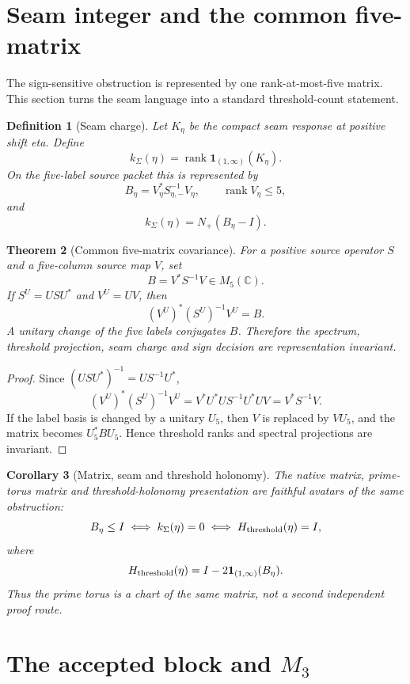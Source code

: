 \documentclass[11pt]{article}
\newtheorem{theorem}{Theorem}[section]
\newtheorem{corollary}[theorem]{Corollary}
\newtheorem{definition}[theorem]{Definition}
\newcommand{\C}{\mathbb C}
\newcommand{\BSEta}{B_\eta}
\newcommand{\kSigma}{k_\Sigma}
\newcommand{\rank}{\operatorname{rank}}
\begin{document}
\section{Seam integer and the common five-matrix}

The sign-sensitive obstruction is represented by one rank-at-most-five matrix.  This section turns the seam language into a standard threshold-count statement.

\begin{definition}[Seam charge]
Let \(K_\eta\) be the compact seam response at positive shift eta.  Define
\[
\kSigma(\eta)=\rank\mathbf 1_{(1,\infty)}(K_\eta).
\]
On the five-label source packet this is represented by
\[
\BSEta=V_\eta^*S_{\eta,-}^{-1}V_\eta,
\qquad
\rank V_\eta\le5,
\]
and
\[
\kSigma(\eta)=N_+(\BSEta-I).
\]
\end{definition}

\begin{theorem}[Common five-matrix covariance]
For a positive source operator \(S\) and a five-column source map \(V\), set
\[
B=V^*S^{-1}V\in M_5(\C).
\]
If \(S^U=USU^*\) and \(V^U=UV\), then
\[
(V^U)^*(S^U)^{-1}V^U=B.
\]
A unitary change of the five labels conjugates \(B\).  Therefore the spectrum, threshold projection, seam charge and sign decision are representation invariant.
\end{theorem}

\begin{proof}
Since \((USU^*)^{-1}=US^{-1}U^*\),
\[
(V^U)^*(S^U)^{-1}V^U
=V^*U^*US^{-1}U^*UV
=V^*S^{-1}V.
\]
If the label basis is changed by a unitary \(U_5\), then \(V\) is replaced by \(VU_5\), and the matrix becomes \(U_5^*BU_5\).  Hence threshold ranks and spectral projections are invariant.
\end{proof}

\begin{corollary}[Matrix, seam and threshold holonomy]
The native matrix, prime-torus matrix and threshold-holonomy presentation are faithful avatars of the same obstruction:
\[
\BSEta\le I
\iff
\kSigma(\eta)=0
\iff
H_{\rm threshold}(\eta)=I,
\]
where
\[
H_{\rm threshold}(\eta)=I-2\mathbf 1_{(1,\infty)}(\BSEta).
\]
Thus the prime torus is a chart of the same matrix, not a second independent proof route.
\end{corollary}

\section{The accepted block and \texorpdfstring{$M_3$}{M3}}
\end{document}
